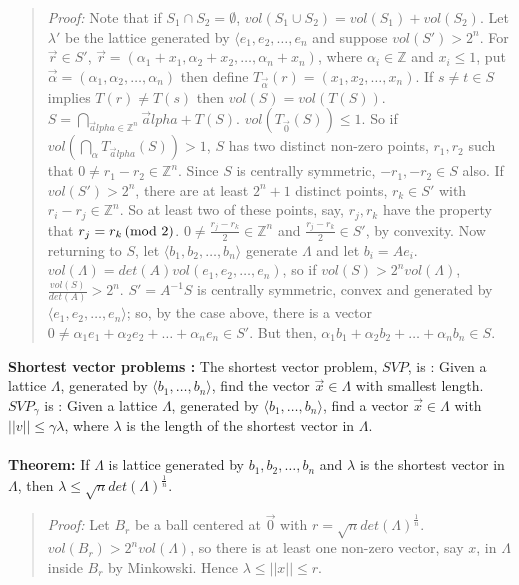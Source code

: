 \begin{quote}
\emph{Proof:}
Note that if $S_1 \cap S_2 = \emptyset$, $vol(S_1 \cup S_2) = vol(S_1) + vol(S_2)$.
Let $\lambda'$ be the lattice generated by $\langle e_1, e_2, \ldots, e_n$ and suppose $vol(S') > 2^n$.
For ${\vec r} \in S'$, ${\vec r} = (\alpha_1 + x_1, \alpha_2 + x_2, \ldots, \alpha_n + x_n)$,
where $\alpha_i \in {\mathbb Z}$ and
$x_i \leq 1$, put ${\vec \alpha} = (\alpha_1, \alpha_2, \ldots , \alpha_n)$ then
define $T_{\vec \alpha}(r) = (x_1, x_2, \ldots, x_n)$.
If $s \ne t \in S$ implies $T(r) \ne T(s)$ then
$vol(S) = vol(T(S))$. $S = \bigcap_{{\vec alpha} \in {\mathbb Z}^n} {\vec alpha} + T(S)$.
$vol(T_{\vec 0}(S)) \leq 1$.   So if $vol(\bigcap_{\alpha}T_{\vec alpha}(S)) > 1$,
$S$ has two distinct non-zero
points, $r_1, r_2$ such that $0 \ne r_1 - r_2 \in {\mathbb Z}^n$. Since $S$ is centrally symmetric, $-r_1, -r_2 \in S$
also.  
If $vol(S') > 2^n$, there are at least $2^n +1$ distinct points, $r_k \in S'$ with $r_i - r_j \in {\mathbb Z}^n$.
So at least two of these points, say, $r_j, r_k$ have the property that $r_j = r_k \thinspace \textnormal{(mod } 2 \textnormal{)}$.
$0 \ne {\frac {r_j - r_k} {2}} \in {\mathbb Z}^n$ and ${\frac {r_j - r_k} {2}} \in S'$, by convexity.
Now returning to $S$, let $\langle b_1, b_2, \ldots, b_n \rangle$ generate $\Lambda$ and let
$b_i = A e_i$. $vol(\Lambda) = det(A) vol(e_1, e_2, \ldots, e_n)$, so if $vol(S) > 2^n vol(\Lambda)$,
${\frac {vol(S)} {det(A)}} > 2^n$.  $S' = A^{-1}S$ is centrally symmetric, convex and
generated by $\langle e_1, e_2, \ldots, e_n \rangle$; so, by the case above, there is a vector
$0 \ne \alpha_1 e_1 +\alpha_2 e_2 + \ldots  +\alpha_n e_n \in S'$.  But then,
$\alpha_1 b_1 +\alpha_2 b_2 + \ldots  +\alpha_n b_n \in S$.
\end{quote}
{\bf Shortest vector problems :}  The shortest vector problem, $SVP$, is :
Given a lattice $\Lambda$, generated by $\langle b_1 , \ldots , b_n \rangle$,
find the vector ${\vec x} \in \Lambda$ with smallest length.
$SVP_{\gamma}$ is :
Given a lattice $\Lambda$, generated by $\langle b_1 , \ldots , b_n \rangle$,
find a vector ${\vec x} \in \Lambda$ with $||v|| \leq \gamma \lambda$, where $\lambda$ is the length of the
shortest vector in $\Lambda$.
\\
\\
{\bf Theorem: } If $\Lambda$ is lattice generated by $b_1, b_2, \ldots, b_n$ and $\lambda$ is the shortest vector
in $\Lambda$, then $\lambda \leq \sqrt{n} det(\Lambda)^{\frac 1 n}$.
\begin{quote}
\emph{Proof:}
Let $B_r$ be a ball centered at ${\vec 0}$ with $r = \sqrt{n}det(\Lambda)^{\frac 1 n}$.
$vol(B_r) > 2^n vol(\Lambda)$, so there is at least one non-zero vector, say $x$, in $\Lambda$ inside $B_r$
by Minkowski. Hence $\lambda \leq ||x|| \leq r$.
\end{quote}
